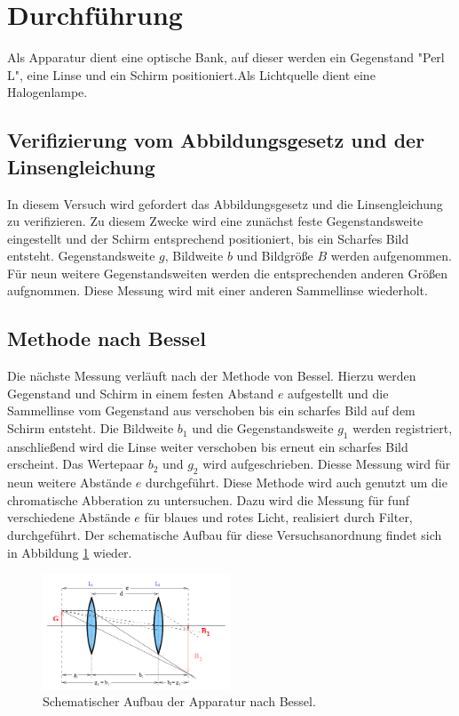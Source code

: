 \section{Durchführung}
\label{sec:Durchführung}
Als Apparatur dient eine optische Bank, auf dieser werden ein Gegenstand "Perl L", eine Linse und ein Schirm
positioniert.Als Lichtquelle dient eine Halogenlampe.
\subsection{Verifizierung vom Abbildungsgesetz und der Linsengleichung}
In diesem Versuch wird gefordert das Abbildungsgesetz und die Linsengleichung zu verifizieren.
Zu diesem Zwecke wird eine zunächst feste Gegenstandsweite eingestellt und der Schirm entsprechend
positioniert, bis ein Scharfes Bild entsteht. Gegenstandsweite $g$, Bildweite $b$ und Bildgröße $B$ werden
aufgenommen. Für neun weitere Gegenstandsweiten werden die entsprechenden anderen Größen aufgnommen.
Diese Messung wird mit einer anderen Sammellinse wiederholt.
\subsection{Methode nach Bessel}
Die nächste Messung verläuft nach der Methode von Bessel. Hierzu werden Gegenstand und Schirm
in einem festen Abstand $e$ aufgestellt und die Sammellinse vom Gegenstand aus verschoben bis ein scharfes Bild
auf dem Schirm entsteht. Die Bildweite $b_\mathrm{1}$ und die Gegenstandsweite $g_\mathrm{1}$ werden
registriert, anschließend wird die Linse weiter verschoben bis erneut ein scharfes Bild erscheint.
Das Wertepaar $b_\mathrm{2}$ und $g_\mathrm{2}$ wird aufgeschrieben. Diesse Messung wird für neun
weitere Abstände $e$ durchgeführt.
Diese Methode wird auch genutzt um die chromatische Abberation zu untersuchen. Dazu wird die Messung
für funf verschiedene Abstände $e$ für blaues und rotes Licht, realisiert durch Filter, durchgeführt.
Der schematische Aufbau für diese Versuchsanordnung findet sich in Abbildung \ref{fig:bessel} wieder.
\begin{figure}
 \centering
 \includegraphics[width=0.5\textwidth]{bessel.png}
 \caption{Schematischer Aufbau der Apparatur nach Bessel.\cite{sample}}
 \label{fig:bessel}
 \end{figure}
